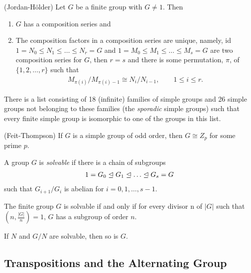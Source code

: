 \documentclass[../main]{subfiles}
\begin{document}
  
  \begin{thm}
   (Jordan-H\"{o}lder) Let $G$ be a finite group with $G \neq 1$. Then 
   \begin{enumerate}
    \item $G$ has a composition series and 
    \item The composition factors in a composition series are unique, namely, id $1=N_0\leq N_1 \leq \ldots \leq N_r = G$ and $1 = M_0 \leq M_1 \leq \ldots \leq M_s = G$ are two composition series for $G$, then $r=s$ and there is some permutation, $\pi$, of $\{1,2,\ldots,r\}$ such that 
    \begin{align*}
     M_{\pi(i)}/M_{\pi(i)-1} \cong N_i/N_{i-1}, \qquad 1\leq i\leq r.
    \end{align*}
   \end{enumerate}
  \end{thm}
  
  
  \begin{thm*}
   There is a list consisting of 18 (infinite) families of simple groups and 26 simple groups not belonging to these families (the \textit{sporadic} simple groups) such that every finite simple group is isomorphic to one of the groups in this list.
  \end{thm*}
  
  
  \begin{thm*}
   (Feit-Thompson) If $G$ is a simple group of odd order, then $G \cong Z_p$ for some prime $p$.
  \end{thm*}
  
  
  \begin{dfn}
   A group $G$ is \textit{solvable} if there is a chain of subgroups
   \begin{align*}
    1=G_0 \trianglelefteq G_1 \trianglelefteq \ldots \trianglelefteq G_s = G 
   \end{align*}
   such that $G_{i+1}/G_i$ is abelian for $i = 0,1,\ldots , s-1$.
  \end{dfn}
  
  
  \begin{thm*}
   The finite group $G$ is solvable if and only if for every divisor n of $|G|$ such that $(n, \frac{|G|}{n})=1$, $G$ has a subgroup of order $n$.
  \end{thm*}
  
  
  \begin{nt}
   If $N$ and $G/N$ are solvable, then so is $G$.
  \end{nt}
  
  
  \subsection{Transpositions and the Alternating Group}
  
\end{document}
